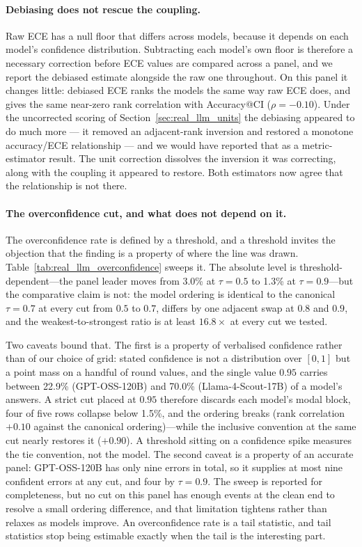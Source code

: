 \documentclass{article}
\begin{document}
\paragraph{Debiasing does not rescue the coupling.} Raw ECE has a null floor that differs across models, because it depends on each model's confidence distribution. Subtracting each model's own floor is therefore a necessary correction before ECE values are compared across a panel, and we report the debiased estimate alongside the raw one throughout. On this panel it changes little: debiased ECE ranks the models the same way raw ECE does, and gives the same near-zero rank correlation with Accuracy@CI ($\rho = -0.10$). Under the uncorrected scoring of Section~\ref{sec:real_llm_units} the debiasing appeared to do much more --- it removed an adjacent-rank inversion and restored a monotone accuracy/ECE relationship --- and we would have reported that as a metric-estimator result. The unit correction dissolves the inversion it was correcting, along with the coupling it appeared to restore. Both estimators now agree that the relationship is not there.

\paragraph{The overconfidence cut, and what does not depend on it.}
The overconfidence rate is defined by a threshold, and a threshold invites the objection that the finding is a property of where the line was drawn. Table~\ref{tab:real_llm_overconfidence} sweeps it. The absolute level is threshold-dependent---the panel leader moves from 3.0\% at $\tau = 0.5$ to 1.3\% at $\tau = 0.9$---but the comparative claim is not: the model ordering is identical to the canonical $\tau = 0.7$ at every cut from $0.5$ to $0.7$, differs by one adjacent swap at $0.8$ and $0.9$, and the weakest-to-strongest ratio is at least $16.8\times$ at every cut we tested.

Two caveats bound that. The first is a property of verbalised confidence rather than of our choice of grid: stated confidence is not a distribution over $[0,1]$ but a point mass on a handful of round values, and the single value $0.95$ carries between 22.9\% (GPT-OSS-120B) and 70.0\% (Llama-4-Scout-17B) of a model's answers. A strict cut placed at $0.95$ therefore discards each model's modal block, four of five rows collapse below 1.5\%, and the ordering breaks (rank correlation $+0.10$ against the canonical ordering)---while the inclusive convention at the same cut nearly restores it ($+0.90$). A threshold sitting on a confidence spike measures the tie convention, not the model. The second caveat is a property of an accurate panel: GPT-OSS-120B has only nine errors in total, so it supplies at most nine confident errors at any cut, and four by $\tau = 0.9$. The sweep is reported for completeness, but no cut on this panel has enough events at the clean end to resolve a small ordering difference, and that limitation tightens rather than relaxes as models improve. An overconfidence rate is a tail statistic, and tail statistics stop being estimable exactly when the tail is the interesting part.
\end{document}
